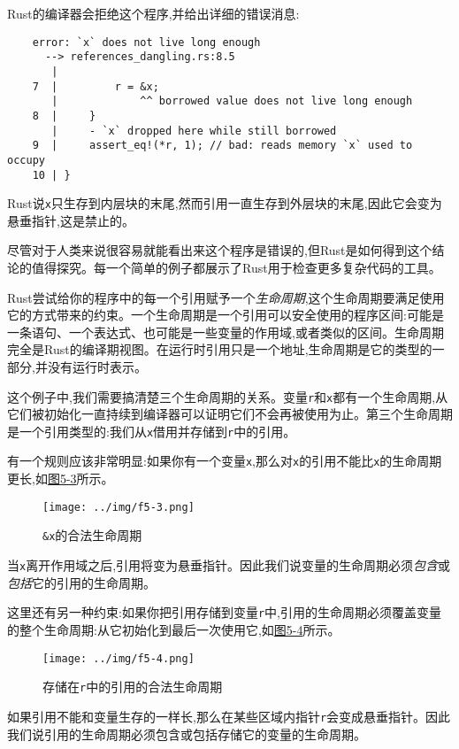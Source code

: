 Rust的编译器会拒绝这个程序,并给出详细的错误消息:
\begin{verbatim}
    error: `x` does not live long enough
      --> references_dangling.rs:8.5
       |
    7  |         r = &x;
       |             ^^ borrowed value does not live long enough
    8  |     }
       |     - `x` dropped here while still borrowed
    9  |     assert_eq!(*r, 1); // bad: reads memory `x` used to occupy
    10 | }
\end{verbatim}

Rust说\texttt{x}只生存到内层块的末尾,然而引用一直生存到外层块的末尾,因此它会变为悬垂指针,这是禁止的。

尽管对于人类来说很容易就能看出来这个程序是错误的,但Rust是如何得到这个结论的值得探究。每一个简单的例子都展示了Rust用于检查更多复杂代码的工具。

Rust尝试给你的程序中的每一个引用赋予一个\emph{生命周期},这个生命周期要满足使用它的方式带来的约束。一个生命周期是一个引用可以安全使用的程序区间:可能是一条语句、一个表达式、也可能是一些变量的作用域,或者类似的区间。生命周期完全是Rust的编译期视图。在运行时引用只是一个地址,生命周期是它的类型的一部分,并没有运行时表示。

这个例子中,我们需要搞清楚三个生命周期的关系。变量\texttt{r}和\texttt{x}都有一个生命周期,从它们被初始化一直持续到编译器可以证明它们不会再被使用为止。第三个生命周期是一个引用类型的:我们从\texttt{x}借用并存储到\texttt{r}中的引用。

有一个规则应该非常明显:如果你有一个变量\texttt{x},那么对\texttt{x}的引用不能比\texttt{x}的生命周期更长,如\hyperref[f5-3]{图5-3}所示。

\begin{figure}[htbp]
    \centering
    \texttt{[image: ../img/f5-3.png]}
    \caption{\texttt{\&x}的合法生命周期}
    \label{f5-3}
\end{figure}

当\texttt{x}离开作用域之后,引用将变为悬垂指针。因此我们说变量的生命周期必须\emph{包含}或\emph{包括}它的引用的生命周期。

这里还有另一种约束:如果你把引用存储到变量\texttt{r}中,引用的生命周期必须覆盖变量的整个生命周期:从它初始化到最后一次使用它,如\hyperref[f5-4]{图5-4}所示。

\begin{figure}[htbp]
    \centering
    \texttt{[image: ../img/f5-4.png]}
    \caption{存储在\texttt{r}中的引用的合法生命周期}
    \label{f5-4}
\end{figure}

如果引用不能和变量生存的一样长,那么在某些区域内指针\texttt{r}会变成悬垂指针。因此我们说引用的生命周期必须包含或包括存储它的变量的生命周期。

